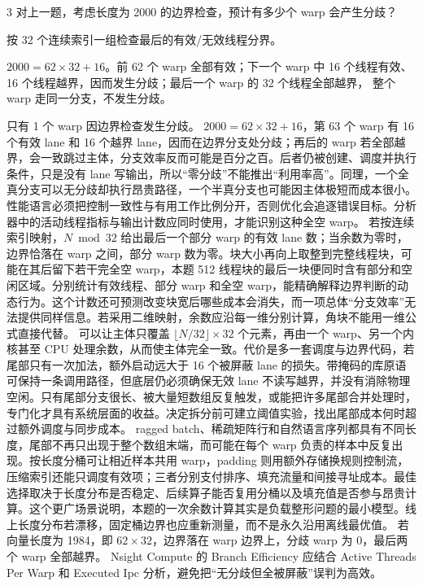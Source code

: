 \begin{solutionexercise}{3}
\problemheading 对上一题，考虑长度为 2000 的边界检查，预计有多少个 warp 会产生分歧？

\approachheading 按 32 个连续索引一组检查最后的有效/无效线程分界。

\answerheading $2000=62\times32+16$。前 62 个 warp 全部有效；下一个 warp 中
16 个线程有效、16 个线程越界，因而发生分歧；最后一个 warp 的 32 个线程全部越界，
整个 warp 走同一分支，不发生分歧。

\conclusionheading 只有 1 个 warp 因边界检查发生分歧。
\discussionheading
{}
$2000=62\times32+16$，第 63 个 warp 有 16 个有效 lane 和 16 个越界 lane，因而在边界分支处分歧；再后的 warp 若全部越界，会一致跳过主体，分支效率反而可能是百分之百。后者仍被创建、调度并执行条件，只是没有 lane 写输出，所以“零分歧”不能推出“利用率高”。同理，一个全真分支可以无分歧却执行昂贵路径，一个半真分支也可能因主体极短而成本很小。性能语言必须把控制一致性与有用工作比例分开，否则优化会追逐错误目标。分析器中的活动线程指标与输出计数应同时使用，才能识别这种全空 warp。
若按连续索引映射，$N\bmod32$ 给出最后一个部分 warp 的有效 lane 数；当余数为零时，边界恰落在 warp 之间，部分 warp 数为零。块大小再向上取整到完整线程块，可能在其后留下若干完全空 warp，本题 512 线程块的最后一块便同时含有部分和空闲区域。分别统计有效线程、部分 warp 和全空 warp，能精确解释边界判断的动态行为。这个计数还可预测改变块宽后哪些成本会消失，而一项总体“分支效率”无法提供同样信息。若采用二维映射，余数应沿每一维分别计算，角块不能用一维公式直接代替。
可以让主体只覆盖 $\lfloor N/32\rfloor\times32$ 个元素，再由一个 warp、另一个内核甚至 CPU 处理余数，从而使主体完全一致。代价是多一套调度与边界代码，若尾部只有一次加法，额外启动远大于 16 个被屏蔽 lane 的损失。带掩码的库原语可保持一条调用路径，但底层仍必须确保无效 lane 不读写越界，并没有消除物理空闲。只有尾部分支很长、被大量短数组反复触发，或能把许多尾部合并处理时，专门化才具有系统层面的收益。决定拆分前可建立阈值实验，找出尾部成本何时超过额外调度与同步成本。
ragged batch、稀疏矩阵行和自然语言序列都具有不同长度，尾部不再只出现于整个数组末端，而可能在每个 warp 负责的样本中反复出现。按长度分桶可让相近样本共用 warp，padding 则用额外存储换规则控制流，压缩索引还能只调度有效项；三者分别支付排序、填充流量和间接寻址成本。最佳选择取决于长度分布是否稳定、后续算子能否复用分桶以及填充值是否参与昂贵计算。这个更广场景说明，本题的一次余数计算其实是负载整形问题的最小模型。线上长度分布若漂移，固定桶边界也应重新测量，而不是永久沿用离线最优值。
\variantheading 若向量长度为 1984，即 $62\times32$，边界落在 warp 边界上，分歧 warp 为 0，最后两个 warp 全部越界。
\practiceheading Nsight Compute 的 Branch Efficiency 应结合 Active Threads Per Warp 和 Executed Ipc 分析，避免把“无分歧但全被屏蔽”误判为高效。
\end{solutionexercise}

